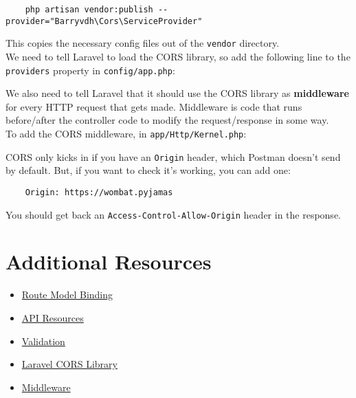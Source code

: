 \begin{verbatim}
    php artisan vendor:publish --provider="Barryvdh\Cors\ServiceProvider"
\end{verbatim}

This copies the necessary config files out of the \texttt{vendor} directory.
\\

We need to tell Laravel to load the CORS library, so add the following line to the \texttt{providers} property in \texttt{config/app.php}:


We also need to tell Laravel that it should use the CORS library as \textbf{middleware} for every HTTP request that gets made. Middleware is code that runs before/after the controller code to modify the request/response in some way.
\\

To add the CORS middleware, in \texttt{app/Http/Kernel.php}:


CORS only kicks in if you have an \texttt{Origin} header, which Postman doesn't send by default. But, if you want to check it's working, you can add one:

\begin{verbatim}
    Origin: https://wombat.pyjamas
\end{verbatim}

You should get back an \texttt{Access-Control-Allow-Origin} header in the response.



\section{Additional Resources}

\begin{itemize}[leftmargin=*]
    \item \href{https://laravel.com/docs/master/routing#route-model-binding}{Route Model Binding}
    \item \href{https://laravel.com/docs/master/eloquent-resources}{API Resources}
    \item \href{http://laravel.com/docs/master/validation}{Validation}
    \item \href{https://github.com/barryvdh/laravel-cors}{Laravel CORS Library}
    \item \href{http://laravel.com/docs/master/middleware}{Middleware}
\end{itemize}
